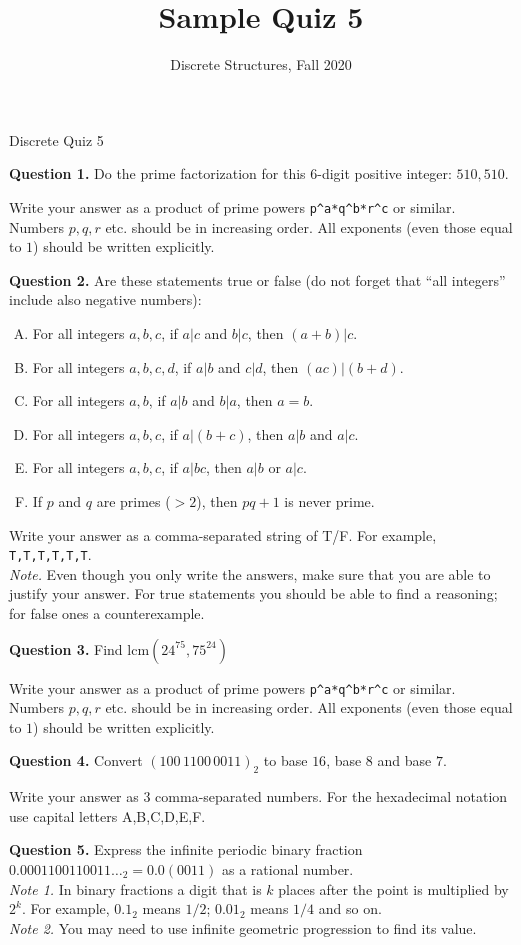 \documentclass[jou]{apa6}
\title{Sample Quiz 5}
\author{Discrete Structures, Fall 2020}
\affiliation{RBS}
\begin{document}
\thispagestyle{empty}

\twocolumn
{\Large Discrete Quiz 5}

\vspace{10pt}
{\bf Question 1.} Do the prime factorization for this 6-digit positive integer: 
$510,510$. 

Write your answer as a product of prime powers {\tt p\^{}a*q\^{}b*r\^{}c} or similar. 
Numbers $p,q,r$ etc. should be in increasing order. All exponents (even those equal to $1$) should be written explicitly.

{\bf Question 2.} Are these statements true or false (do not forget that ``all integers'' include also negative numbers):
\begin{enumerate}[(A)] 
\item For all integers $a,b,c$, if $a|c$ and $b|c$, then $(a + b)|c$.
\item For all integers $a,b,c,d$, if $a|b$ and $c|d$, then $(ac)|(b + d)$.
\item For all integers $a,b$, if $a|b$ and $b|a$, then $a = b$.
\item For all integers $a,b,c$, if $a|(b + c)$, then $a|b$ and $a|c$.
\item For all integers $a,b,c$, if $a|bc$, then $a|b$ or $a|c$.
\item If $p$ and $q$ are primes ($> 2$), then $pq + 1$ is never prime.
\end{enumerate}

Write your answer as a comma-separated string of T/F. For example, {\tt T,T,T,T,T,T}.\\
{\em Note.} Even though you only write the answers, 
make sure that you are able to justify your answer. For true statements you should be able to 
find a reasoning; for false ones \textendash{} a counterexample. 


{\bf Question 3.} Find $\text{lcm}(24^{75},75^{24})$ 

Write your answer as a product of prime powers {\tt p\^{}a*q\^{}b*r\^{}c} or similar. 
Numbers $p,q,r$ etc. should be in increasing order. All exponents (even those equal to $1$) should be written explicitly.

{\bf Question 4.}
Convert $(100\,1100\,0011)_2$ to base $16$, base $8$ and base $7$. 

Write your answer as $3$ comma-separated numbers. For the hexadecimal notation use capital letters A,B,C,D,E,F.

{\bf Question 5.}
Express the infinite periodic binary fraction $0.0001100110011\ldots_2 = 0.0(0011)$ as a rational number.\\
{\em Note 1.} In binary fractions a digit that is $k$ places after the point is multiplied by $2^k$. 
For example, $0.1_2$ means $1/2$; $0.01_2$ means $1/4$ and so on.\\
{\em Note 2.} You may need to use infinite geometric progression to find its value.
\end{document}
